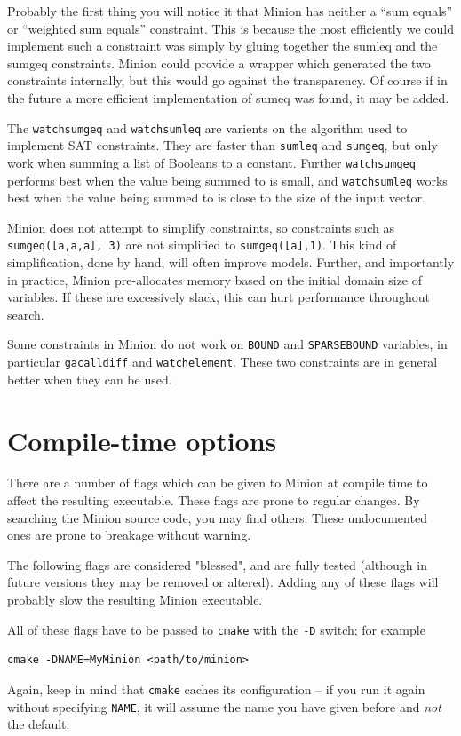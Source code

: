 \documentclass[oneside]{book}
\begin{document}
Probably the first thing you will notice it that Minion has neither a ``sum equals'' or ``weighted sum equals'' constraint. This is because the most efficiently we could implement such a constraint was simply by gluing together the sumleq and the sumgeq constraints. Minion could provide a wrapper which generated the two constraints internally, but this would go against the transparency. Of course if in the future a more efficient implementation of sumeq was found, it may be added.

The \texttt{watchsumgeq} and \texttt{watchsumleq} are varients on the algorithm used to implement SAT constraints. They are faster than \texttt{sumleq} and \texttt{sumgeq}, but only work when summing a list of Booleans to a constant. Further \texttt{watchsumgeq} performs best when the value being summed to is small, and \texttt{watchsumleq} works best when the value being summed to is close to the size of the input vector.

Minion does not attempt to simplify constraints, so constraints such as \texttt{sumgeq([a,a,a], 3)} are not simplified to \texttt{sumgeq([a],1)}. This kind of simplification, done by hand, will often improve models. Further, and importantly in practice, Minion pre-allocates memory based on the initial domain size of variables. If these are excessively slack, this can hurt performance throughout search.

Some constraints in Minion do not work on \texttt{BOUND} and \texttt{SPARSEBOUND} variables, in particular \texttt{gacalldiff} and \texttt{watchelement}. These two constraints are in general better when they can be used.

\section{Compile-time options}\label{compiletime}

There are a number of flags which can be given to Minion at compile time to
affect the resulting executable. These flags are prone to regular changes. By
searching the Minion source code, you may find others. These undocumented ones
are prone to breakage without warning.

The following flags are considered "blessed", and are fully tested (although in
future versions they may be removed or altered). Adding any of these flags
will probably slow the resulting Minion executable.

All of these flags have to be passed to \texttt{cmake} with the \verb+-D+
switch; for example
\begin{verbatim}
cmake -DNAME=MyMinion <path/to/minion>
\end{verbatim}
Again, keep in mind that \texttt{cmake} caches its configuration -- if you run
it again without specifying \verb+NAME+, it will assume the name you have given
before and \emph{not} the default.
\end{document}
